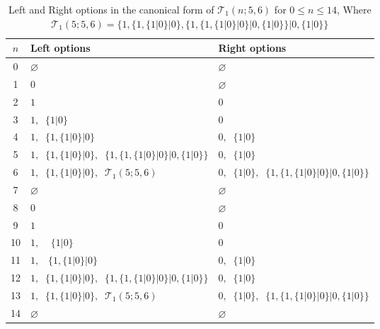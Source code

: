 \documentclass[oneside,reqno]{amsart}
\newcommand{\ts}{\mathcal{T}}
\begin{document}
\begin{table}[h!]
\centering
\caption{Left and Right options in the canonical form of $\ts_{1}(n;5,6)$ for $0 \le n \le 14$, Where $\ts_1(5;5,6)=\{1,\{1,\{1\vert 0\}\vert 0\},\{1,\{1,\{1\vert 0\}\vert 0\}\vert 0,\{1\vert 0\}\}\vert 0,\{1\vert 0\}\}$}
\label{tab: cf of ts1(n;5,6)}
\renewcommand{\arraystretch}{1.2}
\begin{tabular}{|c|p{7.6cm}|p{6cm}|}
\hline
$n$ & Left options & Right options \\
\hline
0  & $\varnothing$ & $\varnothing$ \\ \hline
1  & $0$ & $\varnothing$ \\ \hline
2  & $1$ & $0$ \\ \hline
3  & $1,\;\;\{1\vert 0\}$ & $0$ \\ \hline
4  & $1,\;\;\{1,\{1\vert 0\}\vert 0\}$ & $0,\;\;\{1\vert 0\}$ \\ \hline
5  & $1,\;\;\{1,\{1\vert 0\}\vert 0\},\;\;\{1,\{1,\{1\vert 0\}\vert 0\}\vert 0,\{1\vert 0\}\}$ 
   & $0,\;\;\{1\vert 0\}$ \\ \hline
6  & $1,\;\;\{1,\{1\vert 0\}\vert 0\},\;\;\ts_1(5;5,6) $ 
   & $0,\;\;\{1\vert 0\},\;\;\{1,\{1,\{1\vert 0\}\vert 0\}\vert 0,\{1\vert 0\}\}$ \\ \hline
7  & $\varnothing$ & $\varnothing$ \\ \hline
8  & $0$ & $\varnothing$ \\ \hline
9  & $1$ & $0$ \\ \hline
10 & $1,\;\;\;\;\{1\vert 0\}$ & $0$ \\ \hline
11 & $1,\;\;\;\{1,\{1\vert 0\}\vert 0\}$ & $0,\;\;\{1\vert 0\}$ \\ \hline
12 & $1,\;\;\{1,\{1\vert 0\}\vert 0\},\;\;\{1,\{1,\{1\vert 0\}\vert 0\}\vert 0,\{1\vert 0\}\}$ 
   & $0,\;\;\{1\vert 0\}$ \\ \hline
13 & $1,\;\;\{1,\{1\vert 0\}\vert 0\},\;\;\ts_1(5;5,6) $ 
   & $0,\;\;\{1\vert 0\},\;\;\{1,\{1,\{1\vert 0\}\vert 0\}\vert 0,\{1\vert 0\}\}$ \\ \hline
14 & $\varnothing$  & $\varnothing$ \\ \hline
\end{tabular}
\end{table}
\end{document}
